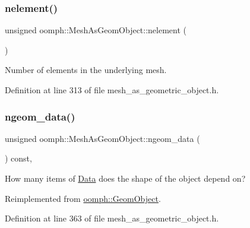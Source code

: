 \mbox{\label{classoomph_1_1MeshAsGeomObject_a331c1f9615df15f8fbde2f0eaa2a19d5}} 
\subsubsection{\texorpdfstring{nelement()}{nelement()}}
{\footnotesize\ttfamily unsigned oomph\+::\+Mesh\+As\+Geom\+Object\+::nelement (\begin{DoxyParamCaption}{ }\end{DoxyParamCaption})\hspace{0.3cm}{\ttfamily [inline]}}



Number of elements in the underlying mesh. 



Definition at line 313 of file mesh\+\_\+as\+\_\+geometric\+\_\+object.\+h.

\mbox{\label{classoomph_1_1MeshAsGeomObject_a47d0c877a05e1d84703052431396cd0c}} 
\subsubsection{\texorpdfstring{ngeom\+\_\+data()}{ngeom\_data()}}
{\footnotesize\ttfamily unsigned oomph\+::\+Mesh\+As\+Geom\+Object\+::ngeom\+\_\+data (\begin{DoxyParamCaption}{ }\end{DoxyParamCaption}) const\hspace{0.3cm}{\ttfamily [inline]}, {\ttfamily [virtual]}}



How many items of \hyperlink{classoomph_1_1Data}{Data} does the shape of the object depend on? 



Reimplemented from \hyperlink{classoomph_1_1GeomObject_a19d325347e19964e127fe124df56f251}{oomph\+::\+Geom\+Object}.



Definition at line 363 of file mesh\+\_\+as\+\_\+geometric\+\_\+object.\+h.

